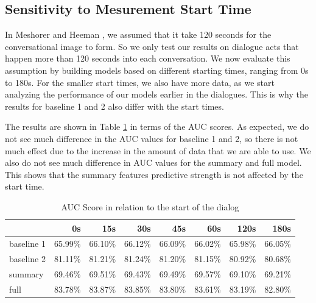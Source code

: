 \subsection{Sensitivity to Mesurement Start Time}

In Meshorer and Heeman \cite{Meshorer2016UsingPS}, we assumed that it take 120 seconds for the conversational image to form. So we only test our results on dialogue acts that happen more than 120 seconds into each conversation. We now evaluate this assumption by building models based on different starting times, ranging from 0s to 180s.  For the smaller start times, we also have more data, as we start analyzing the performance of our models earlier in the dialogues.  This is why the results for baseline 1 and 2 also differ with the start times.

The results are shown in Table \ref{table:starttime} in terms of the AUC scores.  As expected, we do not see much difference in the AUC values for baseline 1 and 2, so there is not much effect due to the increase in the amount of data that we are able to use.  We also do not see much difference in AUC values for the summary and full model.  This shows that the summary features predictive strength is not affected by the start time.

%
\begin{table}[ht!]
\begin{center}
\begin{tabular}{lrrrrrrr}
\toprule
{} & 0s & 15s & 30s & 45s & 60s & {\bf 120s} & 180s  \\
\midrule
baseline 1 & 65.99\% & 66.10\% & 66.12\% & 66.09\%  & 66.02\% & 65.98\% & 66.05\%  \\
baseline 2 & 81.11\% & 81.21\% & 81.24\% & 81.20\%  & 81.15\% & 80.92\% & 80.68\%  \\
summary    & 69.46\% & 69.51\% & 69.43\% & 69.49\%  & 69.57\% & 69.10\% & 69.21\%  \\
full       & 83.78\% & 83.87\% & 83.85\% & 83.80\%  & 83.61\% & 83.19\% & 82.80\%  \\

\bottomrule
\end{tabular}
\end{center}
\caption{ AUC Score in relation to the start of the dialog }
\label{table:starttime}
\end{table}



